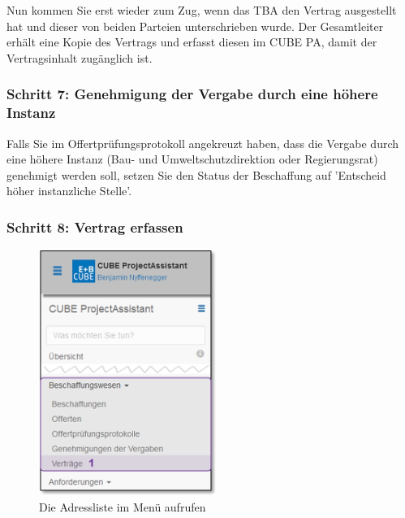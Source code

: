 \vspace{\baselineskip}

Nun kommen Sie erst wieder zum Zug, wenn das TBA den Vertrag ausgestellt hat und dieser von beiden Parteien unterschrieben wurde. Der Gesamtleiter erhält eine Kopie des Vertrags und erfasst diesen im CUBE PA, damit der Vertragsinhalt zugänglich ist.

\subsubsection{Schritt 7: Genehmigung der Vergabe durch eine höhere Instanz}

Falls Sie im Offertprüfungsprotokoll angekreuzt haben, dass die Vergabe durch eine höhere Instanz (Bau- und Umweltschutzdirektion oder Regierungsrat) genehmigt werden soll, setzen Sie den Status der Beschaffung auf 'Entscheid höher instanzliche Stelle'.

\subsubsection{Schritt 8: Vertrag erfassen}

\begin{figure}
  \vspace{-30pt}      %
  \begin{center}
    \includegraphics[height=80mm]{../chapters/07_Beschaffungswesen/pictures/7-1-8_Menu_Besch_Vertraege.jpg}
  \end{center}
  \vspace{-20pt}
  \caption{Die Adressliste im Menü aufrufen}
  \vspace{-10pt}
\end{figure}

